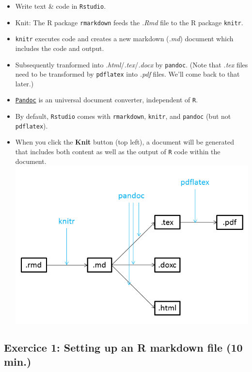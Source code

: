 \documentclass[]{article}
\begin{document}
\begin{itemize}
  \begin{itemize}
  \item
    Write text \& code in \texttt{Rstudio}.
  \item
    Knit: The R package \texttt{rmarkdown} feeds the \emph{.Rmd} file to
    the R package \texttt{knitr}.
  \item
    \texttt{knitr} executes code and creates a new markdown (\emph{.md})
    document which includes the code and output.
  \item
    Subsequently tranformed into \emph{.html}/\emph{.tex}/\emph{.docx}
    by \texttt{pandoc}. (Note that \emph{.tex} files need to be
    transformed by \texttt{pdflatex} into \emph{.pdf} files. We'll come
    back to that later.)
  \item
    \href{https://pandoc.org/}{\texttt{Pandoc}} is an universal document
    converter, independent of \texttt{R}.
  \item
    By default, \texttt{Rstudio} comes with \texttt{rmarkdown},
    \texttt{knitr}, and \texttt{pandoc} (but not \texttt{pdflatex}).
  \item
    When you click the \textbf{Knit} button (top left), a document will
    be generated that includes both content as well as the output of
    \texttt{R} code within the document.\\
    \includegraphics[width=5.20833in,height=\textheight]{../figures/pandoc1.png}
  \end{itemize}
\end{itemize}

\hypertarget{exercice-1-setting-up-an-r-markdown-file-10-min.}{%
\subsection{Exercice 1: Setting up an R markdown file (10
min.)}\label{exercice-1-setting-up-an-r-markdown-file-10-min.}}
\end{document}
